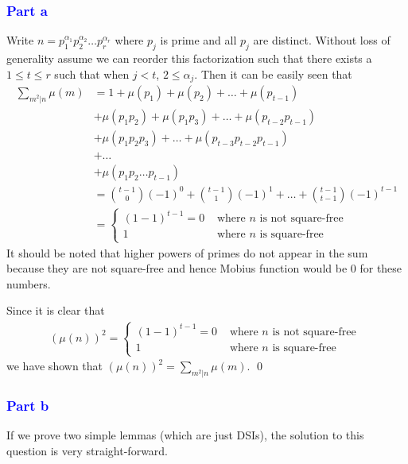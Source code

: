 \documentclass{unswmaths}
\begin{document}
\subsubsection*{\textcolor{blue}{Part a}}
Write $ n = p_1^{\alpha_1} p_2^{\alpha_2} \ldots p_r^{\alpha_r} $ where $ p_j $ 
is prime and all $ p_j $ are distinct.
Without loss of generality assume we can reorder this factorization such that 
there exists a $ 1 \leq t \leq r $ such that
when $ j < t $, $ 2 \leq \alpha_j $.
Then it can be easily seen that
\begin{align*}
    \sum_{m^2 | n } \mu(m) &= 1 + \mu(p_1) + \mu(p_2) + \ldots + \mu(p_{t-1}) \\
        &+ \mu(p_1 p_2) + \mu(p_1 p_3) + \ldots + \mu(p_{t-2} p_{t-1}) \\
        &+ \mu(p_1 p_2 p_3) + \ldots + \mu( p_{t-3} p_{t-2} p_{t-1}) \\
        &+ \ldots \\
        &+ \mu(p_1 p_2 \ldots p_{t-1}) \\
        &=  \binom{t-1}{0}(-1)^{0} + \binom{t-1}{1} (-1)^{1} + \ldots + \binom{t-1}{t-1}(-1)^{t-1} \\
        &= \begin{cases}
               (1-1)^{t-1} = 0 & \text{ where } n \text{ is not square-free } \\
               1 & \text{ where } n \text{ is square-free }
           \end{cases}
\end{align*}
It should be noted that higher powers of primes do not appear in the sum
because they are not square-free and hence Mobius function would be $ 0 $ 
for these numbers.

Since it is clear that 
\begin{align*}
    (\mu(n))^2 = \begin{cases}
        (1-1)^{t-1} = 0 & \text{ where } n \text{ is not square-free } \\
        1 & \text{ where } n \text{ is square-free }
    \end{cases}
\end{align*}
we have shown that $ (\mu(n))^2 = \sum_{m^2 | n} \mu(m) $. \qed

\subsubsection*{\textcolor{blue}{Part b}}
If we prove two simple lemmas (which are just DSIs), the solution to this question is very straight-forward. 
\end{document}
